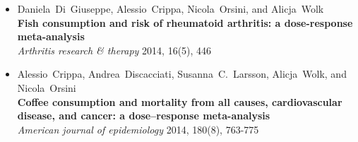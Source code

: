 \begin{itemize}
\item Daniela~Di~Giuseppe, Alessio~Crippa, Nicola~Orsini, and Alicja~Wolk \\ \textbf{Fish consumption and risk of rheumatoid arthritis: a dose-response meta-analysis} \\ \textit{Arthritis research \& therapy} 2014, 16(5), 446
\item Alessio~Crippa, Andrea~Discacciati, Susanna~C.~Larsson, Alicja~Wolk, and Nicola~Orsini \\ \textbf{Coffee consumption and mortality from all causes, cardiovascular disease, and cancer: a dose--response meta-analysis} \\ \textit{American journal of epidemiology} 2014, 180(8), 763-775
\end{itemize}
